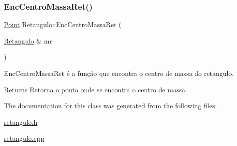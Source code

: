 \subsubsection{\texorpdfstring{Enc\+Centro\+Massa\+Ret()}{EncCentroMassaRet()}}
{\footnotesize\ttfamily \mbox{\hyperlink{class_point}{Point}} Retangulo\+::\+Enc\+Centro\+Massa\+Ret (\begin{DoxyParamCaption}\item[{\mbox{\hyperlink{class_retangulo}{Retangulo}} \&}]{mr }\end{DoxyParamCaption})}



Enc\+Centro\+Massa\+Ret é a função que encontra o centro de massa do retangulo. 

\begin{DoxyReturn}{Returns}
Retorna o ponto onde se encontra o centro de massa. 
\end{DoxyReturn}


The documentation for this class was generated from the following files\+:\begin{DoxyCompactItemize}
\item 
\mbox{\hyperlink{retangulo_8h}{retangulo.\+h}}\item 
\mbox{\hyperlink{retangulo_8cpp}{retangulo.\+cpp}}\end{DoxyCompactItemize}
